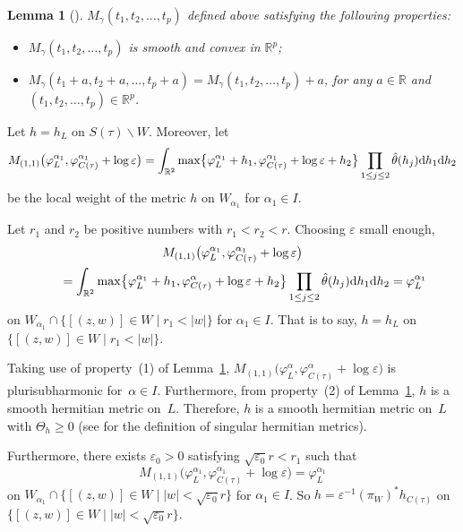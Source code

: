 \documentclass[pdftex]{sigma}
\numberwithin{equation}{section}
\newtheorem{Lemma}[Theorem]{Lemma}
\begin{document}
\begin{Lemma}[{\cite[Lemma~5.18]{Jean}}] \label{Lemma3.18}
 $M_\gamma (t_1,t_2,\dots ,t_p)$ defined above satisfying the following properties:
\begin{itemize}\itemsep=0pt
\item[$(1)$]$M_\gamma (t_1,t_2,\dots ,t_p)$ is smooth and convex in $\mathbb{R}^p$;
\item[$(2)$]$M_\gamma (t_1+a,t_2+a,\dots ,t_p+a)=M_\gamma (t_1,t_2,\dots ,t_p)+a$, for any $a \in \mathbb{R}$ and $(t_1,t_2,\dots ,t_p) \in \mathbb{R}^p$.
\end{itemize}
\end{Lemma}

Let $h=h_L$ on $S(\tau)\backslash W$. Moreover, let
\[
M_{(1,1)}\bigl(\varphi^{\alpha_1}_L,\varphi^{\alpha_1}_{C(\tau)}+\log\varepsilon\bigr)=\int_{\mathbb{R}^2}\max\bigl\{\varphi^{\alpha_1}_L+h_1,\varphi^{\alpha_1}_{C(\tau)}
+\log\varepsilon+h_2 \bigr\}\prod_{1\leq j\leq 2}\hat{\theta}(h_j){\rm d}h_1{\rm d}h_2\]
be the local weight of the metric $h$ on $W_{\alpha_1}$ for $\alpha_1 \in I$.

Let $r_1$ and $r_2$ be positive numbers with $r_1 <r_2<r$. Choosing $\varepsilon$ small enough,
\begin{gather*}
M_{(1,1)}\bigl(\varphi^{\alpha_1}_L,\varphi^{\alpha_1}_{C(\tau)}+\log \varepsilon\bigr)\\
\qquad=\int_{\mathbb{R}^2}\max \bigl\{\varphi^{\alpha_1}_L+h_1,\varphi^\alpha_{C(\tau)}+\log\varepsilon +h_2 \bigr\} \prod_{1 \leq j \leq 2} \hat{\theta} (h_j){\rm d} h_1 {\rm d} h_2 =\varphi^{\alpha_1}_L
\end{gather*}
on $W_{\alpha_1} \cap \{ [(z,w)] \in W \mid r_1 <|w| \}$ for $\alpha_1 \in I$. That is to say, $h=h_L$ on $ \{ [(z,w)] \in W \mid r_1<|w| \}$.

Taking use of property~(1) of Lemma~\ref{Lemma3.18}, $M_{(1,1)}\bigl(\varphi^\alpha_L,\varphi^\alpha_{C(\tau)}+\log \varepsilon\bigr)$ is plurisubharmonic for~${\alpha\in I}$. Furthermore, from property~(2) of Lemma~\ref{Lemma3.18}, $h$ is a smooth hermitian metric on~$L$. Therefore, $h$ is a smooth hermitian metric on~$L$ with $\Theta_{h}\geq 0 $ (see \cite[Section~8.2]{Vincent-Ahmed} for the definition of singular hermitian metrics).

Furthermore, there exists $\varepsilon_0 >0$ satisfying $\sqrt{\varepsilon_0}r<r_1$ such that
\[
M_{(1,1)}\bigl(\varphi^{\alpha_1}_L,\varphi^{\alpha_1}_{C(\tau)}+\log \varepsilon\bigr)=\varphi^{\alpha_1}_L
\]
on $W_{\alpha_1} \cap \{ [(z,w)] \in W\mid |w|< \sqrt{\varepsilon_0}r \}$ for $\alpha_1 \in I$. So
$h=\varepsilon^{-1}(\pi_W)^*h_{C(\tau)}$ on $\{ [(z,w)] \in W \mid |w|< \sqrt{\varepsilon_0} r \}$.
\end{document}
